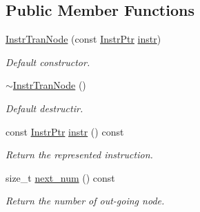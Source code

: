 \subsection*{Public Member Functions}
\begin{DoxyCompactItemize}
\item 
\mbox{\label{classilang_1_1_instr_tran_node_a5380fac61ab83d2b03e9c50788061b6a}} 
\mbox{\hyperlink{classilang_1_1_instr_tran_node_a5380fac61ab83d2b03e9c50788061b6a}{Instr\+Tran\+Node}} (const \mbox{\hyperlink{namespaceilang_af88a19312ae653d687a0d1207bb284f6}{Instr\+Ptr}} \mbox{\hyperlink{classilang_1_1_instr_tran_node_a386f522ded97759ac3a1db089029307f}{instr}})
\begin{DoxyCompactList}\small\item\em Default constructor. \end{DoxyCompactList}\item 
\mbox{\label{classilang_1_1_instr_tran_node_af85a50b384c56d0f8723a13d18fca64a}} 
\mbox{\hyperlink{classilang_1_1_instr_tran_node_af85a50b384c56d0f8723a13d18fca64a}{$\sim$\+Instr\+Tran\+Node}} ()
\begin{DoxyCompactList}\small\item\em Default destructir. \end{DoxyCompactList}\item 
\mbox{\label{classilang_1_1_instr_tran_node_a386f522ded97759ac3a1db089029307f}} 
const \mbox{\hyperlink{namespaceilang_af88a19312ae653d687a0d1207bb284f6}{Instr\+Ptr}} \mbox{\hyperlink{classilang_1_1_instr_tran_node_a386f522ded97759ac3a1db089029307f}{instr}} () const
\begin{DoxyCompactList}\small\item\em Return the represented instruction. \end{DoxyCompactList}\item 
\mbox{\label{classilang_1_1_instr_tran_node_a6bdb9ed63da3b3835839e7768f71ad21}} 
size\+\_\+t \mbox{\hyperlink{classilang_1_1_instr_tran_node_a6bdb9ed63da3b3835839e7768f71ad21}{next\+\_\+num}} () const
\begin{DoxyCompactList}\small\item\em Return the number of out-\/going node. \end{DoxyCompactList}\item 

\end{DoxyCompactItemize}
